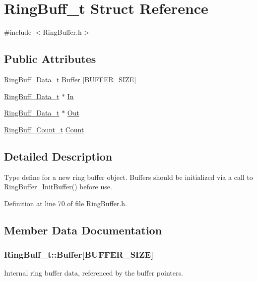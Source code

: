 \hypertarget{struct_ring_buff__t}{\section{\-Ring\-Buff\-\_\-t \-Struct \-Reference}
\label{struct_ring_buff__t}
}


{\ttfamily \#include $<$\-Ring\-Buffer.\-h$>$}

\subsection*{\-Public \-Attributes}
\begin{DoxyCompactItemize}
\item 
\hyperlink{_ring_buffer_8h_acf1a805a0c6814d6d188a8484895cda4}{\-Ring\-Buff\-\_\-\-Data\-\_\-t} \hyperlink{struct_ring_buff__t_a081d1a431305d4c16b2fcb7c61774117}{\-Buffer} \mbox{[}\hyperlink{_ring_buffer_8h_a6b20d41d6252e9871430c242cb1a56e7}{\-B\-U\-F\-F\-E\-R\-\_\-\-S\-I\-Z\-E}\mbox{]}
\item 
\hyperlink{_ring_buffer_8h_acf1a805a0c6814d6d188a8484895cda4}{\-Ring\-Buff\-\_\-\-Data\-\_\-t} $\ast$ \hyperlink{struct_ring_buff__t_ace48fed7a87967d5de48671dcd356ac6}{\-In}
\item 
\hyperlink{_ring_buffer_8h_acf1a805a0c6814d6d188a8484895cda4}{\-Ring\-Buff\-\_\-\-Data\-\_\-t} $\ast$ \hyperlink{struct_ring_buff__t_adff6acf088e2c9697b9f19fb9ff91739}{\-Out}
\item 
\hyperlink{_ring_buffer_8h_ac7138106260c3e40b496566bddacf8f1}{\-Ring\-Buff\-\_\-\-Count\-\_\-t} \hyperlink{struct_ring_buff__t_a41a9ebbce17afd63c9b1052b9374ab7f}{\-Count}
\end{DoxyCompactItemize}


\subsection{\-Detailed \-Description}
\-Type define for a new ring buffer object. \-Buffers should be initialized via a call to \-Ring\-Buffer\-\_\-\-Init\-Buffer() before use. 

\-Definition at line 70 of file \-Ring\-Buffer.\-h.



\subsection{\-Member \-Data \-Documentation}
\hypertarget{struct_ring_buff__t_a081d1a431305d4c16b2fcb7c61774117}{
\subsubsection[{\-Buffer}]{ {\bf \-Ring\-Buff\-\_\-t\-::\-Buffer}\mbox{[}{\bf \-B\-U\-F\-F\-E\-R\-\_\-\-S\-I\-Z\-E}\mbox{]}}}\label{struct_ring_buff__t_a081d1a431305d4c16b2fcb7c61774117}
\-Internal ring buffer data, referenced by the buffer pointers. 

